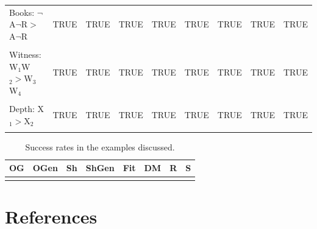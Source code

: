 \documentclass[
  10pt,
]{scrartcl}
\begin{document}
\begin{table}[H]
{\begin{tabular}[t]{lllllllll}
Books: $\neg$A$\neg$R$>$A$\neg$R & TRUE & TRUE & TRUE & TRUE & TRUE & TRUE & TRUE & TRUE\\
\cellcolor{gray!6}{Books: $\neg$A$\neg$R$>\neg$AR} & \cellcolor{gray!6}{TRUE} & \cellcolor{gray!6}{TRUE} & \cellcolor{gray!6}{TRUE} & \cellcolor{gray!6}{TRUE} & \cellcolor{gray!6}{TRUE} & \cellcolor{gray!6}{TRUE} & \cellcolor{gray!6}{TRUE} & \cellcolor{gray!6}{TRUE}\\
Witness: W$_1$W$_2>$W$_3$W$_4$ & TRUE & TRUE & TRUE & TRUE & TRUE & TRUE & TRUE & TRUE\\
\cellcolor{gray!6}{Witness: W$_4$W$_5>$W$_3$W$_4$} & \cellcolor{gray!6}{TRUE} & \cellcolor{gray!6}{TRUE} & \cellcolor{gray!6}{TRUE} & \cellcolor{gray!6}{TRUE} & \cellcolor{gray!6}{TRUE} & \cellcolor{gray!6}{TRUE} & \cellcolor{gray!6}{TRUE} & \cellcolor{gray!6}{TRUE}\\
Depth: X$_1>$X$_2$ & TRUE & TRUE & TRUE & TRUE & TRUE & TRUE & TRUE & TRUE\\
\cellcolor{gray!6}{Dodecahedron:  Regular $=$  Dodecahedron} & \cellcolor{gray!6}{TRUE} & \cellcolor{gray!6}{TRUE} & \cellcolor{gray!6}{FALSE} & \cellcolor{gray!6}{FALSE} & \cellcolor{gray!6}{FALSE} & \cellcolor{gray!6}{FALSE} & \cellcolor{gray!6}{FALSE} & \cellcolor{gray!6}{TRUE}\\
\bottomrule
\end{tabular}}
\end{table}

\begin{table}[H]

\caption{\label{tab:success}Success rates in the examples discussed.}
\centering
\begin{tabular}[t]{rrrrrrrr}
\toprule
OG & OGen & Sh & ShGen & Fit & DM & R & S\\
\midrule
\cellcolor{gray!6}{0.733} & \cellcolor{gray!6}{0.733} & \cellcolor{gray!6}{0.706} & \cellcolor{gray!6}{0.647} & \cellcolor{gray!6}{0.706} & \cellcolor{gray!6}{0.647} & \cellcolor{gray!6}{0.706} & \cellcolor{gray!6}{1}\\
\bottomrule
\end{tabular}
\end{table}

\hypertarget{references}{%
\section*{References}\label{references}}
\end{document}
